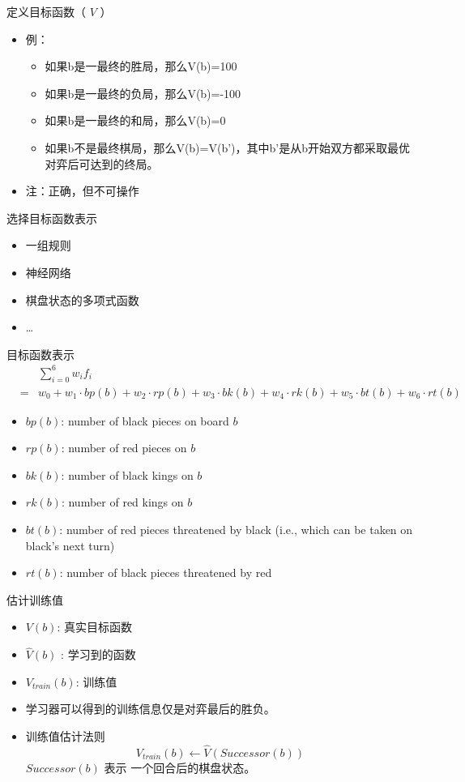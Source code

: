 \documentclass[aspectratio=169]{beamer}
\begin{document}
\begin{frame}[label={sec:org0e400c0}]{定义目标函数（ \(V\) ）}
\begin{itemize}
\item 例：
\begin{itemize}
\item 如果b是一最终的胜局，那么V(b)=100
\item 如果b是一最终的负局，那么V(b)=-100
\item 如果b是一最终的和局，那么V(b)=0
\item 如果b不是最终棋局，那么V(b)=V(b')，其中b'是从b开始双方都采取最优对弈后可达到的终局。
\end{itemize}
\item 注：正确，但不可操作
\end{itemize}
\end{frame}
\begin{frame}[label={sec:org7c61b54}]{选择目标函数表示}
\begin{itemize}
\item 一组规则
\item 神经网络
\item 棋盘状态的多项式函数
\item \ldots{}
\end{itemize}
\end{frame}
\begin{frame}[label={sec:org47af54f}]{目标函数表示}
\begin{eqnarray*}
&&\sum_{i=0}^6 w_i f_i \\
&=&w_{0} + w_{1}\cdot bp(b) + w_{2}\cdot rp(b) + w_{3}\cdot bk(b) + w_{4}\cdot rk(b) + w_{5}\cdot bt(b) + w_{6}\cdot rt(b)
\end{eqnarray*}


\begin{itemize}
\item \(bp(b)\): number of black pieces on board \(b\)
\item \(rp(b)\): number of red pieces on \(b\)
\item \(bk(b)\): number of black kings on \(b\)
\item \(rk(b)\): number of red kings on \(b\)
\item \(bt(b)\): number of red pieces threatened by black (i.e., which can be taken
on black's next turn)
\item \(rt(b)\):  number of black pieces threatened by red
\end{itemize}
\end{frame}
\begin{frame}[label={sec:orgfc80ebb}]{估计训练值}
\begin{itemize}
\item \(V(b)\): 真实目标函数
\item \(\hat{V}(b)\) : 学习到的函数
\item \(V_{train}(b)\): 训练值

\item 学习器可以得到的训练信息仅是对弈最后的胜负。
\item 训练值估计法则 
$$V_{train}(b) \leftarrow \hat{V}(Successor(b))$$
\(Successor(b)\) 表示 一个回合后的棋盘状态。
\end{itemize}
\end{frame}
\end{document}
